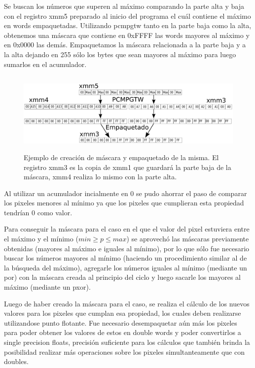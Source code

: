 Se buscan los números que superen al máximo comparando la parte alta y baja con el registro xmm5 preparado al inicio del programa el cuál contiene el máximo en words empaquetadas. Utilizando pcmpgtw tanto en la parte baja como la alta, obtenemos una máscara que contiene en 0xFFFF las words mayores al máximo y en 0x0000 las demás. Empaquetamos la máscara relacionada a la parte baja y a la alta dejando en 255 sólo los bytes que sean mayores al máximo para luego sumarlos en el acumulador.


\begin{figure}[ht!]
\centering
\includegraphics[width=150mm, height=40mm]{cpmmax.png}
\caption{Ejemplo de creación de máscara y empaquetado de la misma. El registro xmm3 es la copia de xmm1 que guardará la parte baja de la máscara, xmm4 realiza lo mismo con la parte alta.}
\label{overflow}
\end{figure}

Al utilizar un acumulador incialmente en 0 se pudo ahorrar el paso de comparar los pixeles menores al mínimo ya que los pixeles que cumplieran esta propiedad tendrían 0 como valor.

Para conseguir la máscara para el caso en el que el valor del pixel estuviera entre el máximo y el mínimo ($min \geq p \leq max$) se aprovechó las máscaras previamente obtenidas (mayores al máximo e iguales al mínimo), por lo que sólo fue necesario buscar los números mayores al mínimo (haciendo un procedimiento similar al de la búsqueda del máximo), agregarle los números iguales al mínimo (mediante un por) con la máscara creada al principio del ciclo y luego sacarle los mayores al máximo (mediante un pxor).

Luego de haber creado la máscara para el caso, se realiza el cálculo de los nuevos valores para los pixeles que cumplan esa propiedad, los cuales deben realizarse utilizandose punto flotante. Fue necesario desempaquetar aún más los pixeles para poder obtener los valores de estos en double words y poder convertirlos a single precision floats, precisión suficiente para los cálculos que también brinda la posibilidad realizar más operaciones sobre los pixeles simultanteamente que con doubles.

